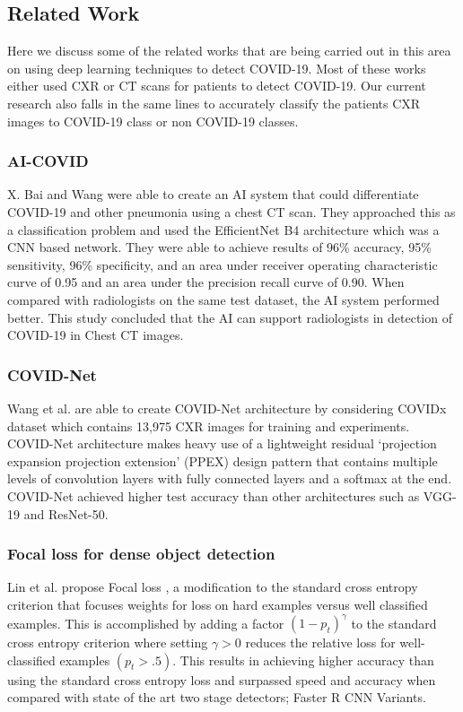 \documentclass{sigkddExp}
\begin{document}
\subsection{Related Work}

Here we discuss some of the related works that are being carried out in this
area on using deep learning techniques to detect COVID-19. Most of these works
either used CXR or CT scans for patients to detect COVID-19. Our current
research also falls in the same lines to accurately classify the patients CXR
images to COVID-19 class or non COVID-19 classes.

\subsubsection{AI-COVID}

X. Bai and Wang \cite{pmid32339081} were able to create an AI system that could
differentiate COVID-19 and other pneumonia using a chest CT scan. They
approached this as a classification problem and used the EfficientNet B4
architecture which was a CNN based network. They were able to achieve results of
96\% accuracy, 95\% sensitivity, 96\% specificity, and an area under receiver
operating characteristic curve of 0.95 and an area under the precision recall
curve of 0.90. When compared with radiologists on the same test dataset, the AI
system performed better. This study concluded that the AI can support
radiologists in detection of COVID-19 in Chest CT images.

\subsubsection{COVID-Net}

Wang et al. are able to create COVID-Net \cite{wang2020covidnet} architecture by
considering COVIDx dataset which contains 13,975 CXR images for training and
experiments. COVID-Net architecture makes heavy use of a lightweight residual
‘projection expansion projection extension’ (PPEX) design pattern that contains
multiple levels of convolution layers with fully connected layers and a softmax
at the end. COVID-Net achieved higher test accuracy than other architectures
such as VGG-19 and ResNet-50.


\subsubsection{Focal loss for dense object detection}

Lin et al. propose Focal loss \cite{lin2018focal}, a
modification to the standard cross entropy criterion that focuses weights for
loss on hard examples versus well classified examples. This is accomplished by
adding a factor $(1 - p_t)^\gamma$ to the standard cross entropy criterion where
setting $\gamma  > 0$ reduces the relative loss for well-classified examples
$(p_t > .5)$. This results in achieving higher accuracy than using the standard
cross entropy loss and surpassed speed and accuracy when compared with state of
the art two stage detectors; Faster R CNN Variants.
\end{document}
